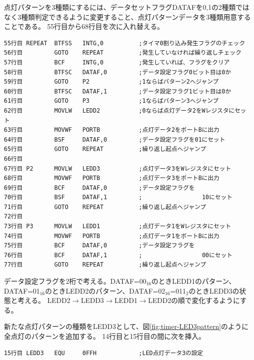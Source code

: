 \documentclass[a4paper,12pt]{ujarticle}
\begin{document}
      点灯パターンを3種類にするには、データセットフラグDATAFを0,1の2種類ではなく3種類判定できるように変更すること、点灯パターンデータを3種類用意することである。
55行目から68行目を次に入れ替える。
      \begin{lstlisting}[basicstyle=\ttfamily\footnotesize, frame=single]
55行目 REPEAT  BTFSS   INTG,0          ;タイマ0割り込み発生フラグのチェック
56行目         GOTO    REPEAT          ;発生していなければ繰り返しチェック
57行目         BCF     INTG,0          ;発生していれば、フラグをクリア
58行目         BTFSC   DATAF,0         ;データ設定フラグ0ビット目は0か
59行目         GOTO    P2              ;1ならばパターン2へジャンプ
60行目         BTFSC   DATAF,1         ;データ設定フラグ1ビット目は0か
61行目         GOTO    P3              ;1ならばパターン3へジャンプ
62行目         MOVLW   LEDD2           ;0ならば点灯データ2をWレジスタにセット
63行目         MOVWF   PORTB           ;点灯データ2をポートBに出力
64行目         BSF     DATAF,0         ;データ設定フラグを01にセット
65行目         GOTO    REPEAT          ;繰り返し起点へジャンプ
66行目
67行目 P2      MOVLW   LEDD3           ;点灯データ3をWレジスタにセット
68行目         MOVWF   PORTB           ;点灯データ3をポートBに出力
69行目         BCF     DATAF,0         ;データ設定フラグを
70行目         BSF     DATAF,1         ;                 10にセット
71行目         GOTO    REPEAT          ;繰り返し起点へジャンプ
72行目
73行目 P3      MOVLW   LEDD1           ;点灯データ1をWレジスタにセット
74行目         MOVWF   PORTB           ;点灯データ1をポートBに出力
75行目         BCF     DATAF,0         ;データ設定フラグを
76行目         BCF     DATAF,1         ;                 00にセット
77行目         GOTO    REPEAT          ;繰り返し起点へジャンプ
      \end{lstlisting}

       データ設定フラグを2桁で考える。DATAF=00$_{16}$のときLEDD1のパターン、DATAF=01$_{16}$のときLEDD2のパターン、DATAF=02$_{16}$=011$_2$のときLEDD3の状態と考える。
       LEDD2$\to$LEDD3$\to$LEDD1$\to$LEDD2の順で変化するようにする。

       新たな点灯パターンの種類をLEDD3として、図\ref{fig:timer-LED3pattern}のように全点灯のパターンを追加する。
14行目と15行目の間に次を挿入。
      \begin{lstlisting}[basicstyle=\ttfamily\footnotesize, frame=single]
15行目 LEDD3   EQU     0FFH            ;LED点灯データ3の設定
      \end{lstlisting}
\end{document}
